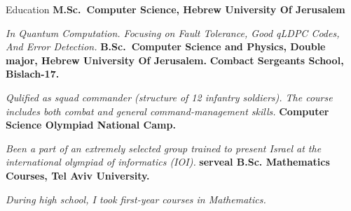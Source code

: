 \newcommand{\huji}{Hebrew University Of Jerusalem}
\begin{rubric}{Education}
  \entry*[2021 -- now]%
  \textbf{M.Sc.~Computer Science, \huji}\par
  \emph{In Quantum Computation. Focusing on Fault Tolerance, Good qLDPC Codes, And Error Detection.}
  \entry*[2018 -- 2021]%
  \textbf{B.Sc.~Computer Science and Physics, Double major, \huji.}
  \entry*[2016]%
  \textbf{Combact Sergeants School, Bislach-17.}\par
  \emph{Qulified as squad commander (structure of 12 infantry soldiers). The course includes both combat and general command-management skills.}
  \entry*[2013 -- 2014]%
  \textbf{Computer Science Olympiad National Camp.}\par
  \emph{Been a part of an extremely selected group trained to present Israel at the international olympiad of informatics (IOI).}
  \entry*[2012 -- 2014]%
  \textbf{serveal B.Sc. Mathematics Courses, Tel Aviv University. }\par
  \emph{During high school, I took first-year courses in Mathematics.}
\end{rubric}
